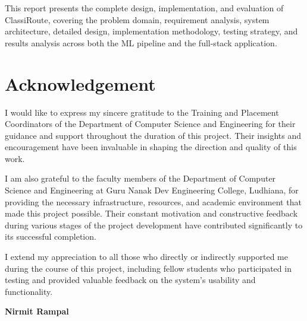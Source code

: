 \documentclass[oneside,12pt,a4paper]{report}
\begin{document}
This report presents the complete design, implementation, and evaluation of ClassiRoute, covering the problem domain, requirement analysis, system architecture, detailed design, implementation methodology, testing strategy, and results analysis across both the ML pipeline and the full-stack application.

\chapter*{Acknowledgement}

I would like to express my sincere gratitude to the Training and Placement Coordinators of the Department of Computer Science and Engineering for their guidance and support throughout the duration of this project. Their insights and encouragement have been invaluable in shaping the direction and quality of this work.

I am also grateful to the faculty members of the Department of Computer Science and Engineering at Guru Nanak Dev Engineering College, Ludhiana, for providing the necessary infrastructure, resources, and academic environment that made this project possible. Their constant motivation and constructive feedback during various stages of the project development have contributed significantly to its successful completion.

I extend my appreciation to all those who directly or indirectly supported me during the course of this project, including fellow students who participated in testing and provided valuable feedback on the system's usability and functionality.

\vfill

\noindent\textbf{Nirmit Rampal}

\listoffigures

\listoftables

\renewcommand{\contentsname}{Table of Contents}
\tableofcontents
\end{document}
